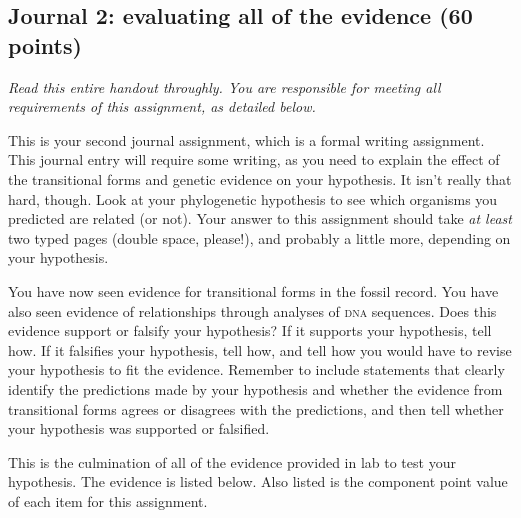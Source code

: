 \documentclass[12pt]{exam}
\begin{document}
\subsection*{Journal 2: evaluating all of the evidence (60 points)}

\emph{Read this entire handout throughly. You are responsible for meeting all requirements of this assignment, as detailed below.}

This is your second journal assignment, which is a formal writing assignment. 
This journal entry will require
some writing, as you need to explain the effect of the transitional forms and genetic evidence on your hypothesis. It isn't really that hard,
though. Look at your phylogenetic hypothesis to see which organisms you
predicted are related (or not). Your answer to this assignment should
take \emph{at least} two typed pages (double space, please!), and
probably a little more, depending on your hypothesis.

You have now seen evidence for transitional forms in the
fossil record. You have also seen evidence of relationships through 
analyses of \textsc{dna} sequences. Does this evidence support or falsify your hypothesis? If it
supports your hypothesis, tell how. If it falsifies your hypothesis,
tell how, and tell how you would have to revise your hypothesis to fit
the evidence. Remember to include statements that clearly identify the
predictions made by your hypothesis and whether the evidence from
transitional forms agrees or disagrees with the predictions, and then
tell whether your hypothesis was supported or falsified.

This is the culmination of all of the evidence provided in lab to test your hypothesis.
The evidence is listed below. Also listed is the component point value of each item for this assignment.
\end{document}
